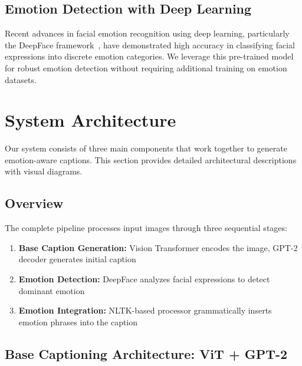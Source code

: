 \documentclass[12pt]{article}
\begin{document}
\subsection{Emotion Detection with Deep Learning}
Recent advances in facial emotion recognition using deep learning, particularly the DeepFace framework~\cite{deepface2023}, have demonstrated high accuracy in classifying facial expressions into discrete emotion categories. We leverage this pre-trained model for robust emotion detection without requiring additional training on emotion datasets.

\section{System Architecture}

Our system consists of three main components that work together to generate emotion-aware captions. This section provides detailed architectural descriptions with visual diagrams.

\subsection{Overview}
The complete pipeline processes input images through three sequential stages:
\begin{enumerate}
\item \textbf{Base Caption Generation:} Vision Transformer encodes the image, GPT-2 decoder generates initial caption
\item \textbf{Emotion Detection:} DeepFace analyzes facial expressions to detect dominant emotion
\item \textbf{Emotion Integration:} NLTK-based processor grammatically inserts emotion phrases into the caption
\end{enumerate}

\subsection{Base Captioning Architecture: ViT + GPT-2}
\end{document}
